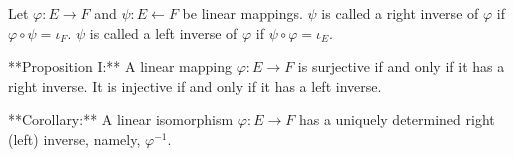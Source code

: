 Let $\varphi: E \to F$ and $\psi: E \leftarrow F$ be linear mappings. $\psi$ is called a right inverse of $\varphi$ if $\varphi \circ \psi = \iota_F$. $\psi$ is called a left inverse of $\varphi$ if $\psi \circ \varphi = \iota_E$.

**Proposition I:** A linear mapping $\varphi: E \to F$ is surjective if and only if it has a right inverse. It is injective if and only if it has a left inverse.

**Corollary:** A linear isomorphism $\varphi: E \to F$ has a uniquely determined right (left) inverse, namely, $\varphi^{-1}$.
